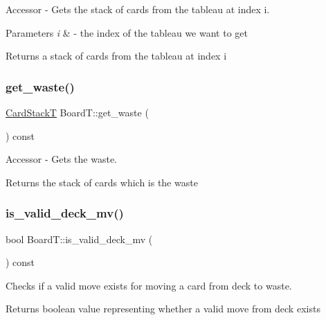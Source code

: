 Accessor -\/ Gets the stack of cards from the tableau at index i. 


\begin{DoxyParams}{Parameters}
{\em i} & -\/ the index of the tableau we want to get \\
\hline
\end{DoxyParams}
\begin{DoxyReturn}{Returns}
a stack of cards from the tableau at index i 
\end{DoxyReturn}
\mbox{\label{class_board_t_a36885ac5b8a2a6adfda866a3f9e8fe3a}} 
\subsubsection{\texorpdfstring{get\+\_\+waste()}{get\_waste()}}
{\footnotesize\ttfamily \hyperlink{_card_stack_8h_a29a6854caf5fec306ee8fc0c6b453837}{Card\+StackT} Board\+T\+::get\+\_\+waste (\begin{DoxyParamCaption}{ }\end{DoxyParamCaption}) const}



Accessor -\/ Gets the waste. 

\begin{DoxyReturn}{Returns}
the stack of cards which is the waste 
\end{DoxyReturn}
\mbox{\label{class_board_t_a1cd8b938fe085438ab670b652081ac1d}} 
\subsubsection{\texorpdfstring{is\+\_\+valid\+\_\+deck\+\_\+mv()}{is\_valid\_deck\_mv()}}
{\footnotesize\ttfamily bool Board\+T\+::is\+\_\+valid\+\_\+deck\+\_\+mv (\begin{DoxyParamCaption}{ }\end{DoxyParamCaption}) const}



Checks if a valid move exists for moving a card from deck to waste. 

\begin{DoxyReturn}{Returns}
boolean value representing whether a valid move from deck exists 
\end{DoxyReturn}
\mbox{\label{class_board_t_a0a3ca85b17b45eab0a4c644011e7328a}} 
